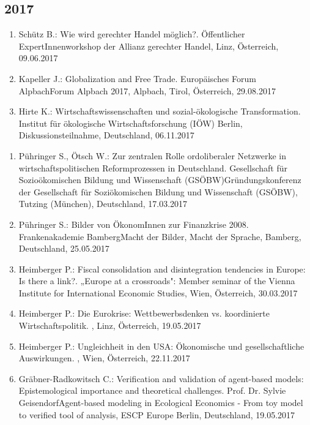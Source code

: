 \subsection*{2017}

\begin{enumerate}
	\item Schütz B.: Wie wird gerechter Handel möglich?. Öffentlicher ExpertInnenworkshop der Allianz gerechter Handel, Linz, Österreich, 09.06.2017
	\item Kapeller J.: Globalization and Free Trade. Europäisches Forum AlpbachForum Alpbach 2017, Alpbach, Tirol, Österreich, 29.08.2017
	\item Hirte K.: Wirtschaftswissenschaften und sozial-ökologische Transformation. Institut für ökologische Wirtschaftsforschung (IÖW) Berlin, Diskussionsteilnahme, Deutschland, 06.11.2017
\end{enumerate}

\begin{enumerate}
	\item Pühringer S., Ötsch W.: Zur zentralen Rolle ordoliberaler Netzwerke in wirtschaftspolitischen Reformprozessen in Deutschland. Gesellschaft für Sozioökomischen Bildung und Wissenschaft (GSÖBW)Gründungskonferenz der Gesellschaft für Soziökomischen Bildung und Wissenschaft (GSÖBW), Tutzing (München), Deutschland, 17.03.2017
	\item Pühringer S.: Bilder von ÖkonomInnen zur Finanzkrise 2008. Frankenakademie BambergMacht der Bilder, Macht der Sprache, Bamberg, Deutschland, 25.05.2017
	\item Heimberger P.: Fiscal consolidation and disintegration tendencies in Europe: Is there a link?. „Europe at a crossroads": Member seminar of the Vienna Institute for International Economic Studies, Wien, Österreich, 30.03.2017
	\item Heimberger P.: Die Eurokrise: Wettbewerbsdenken vs. koordinierte Wirtschaftspolitik. , Linz, Österreich, 19.05.2017
	\item Heimberger P.: Ungleichheit in den USA: Ökonomische und gesellschaftliche Auswirkungen. , Wien, Österreich, 22.11.2017
	\item Gräbner-Radkowitsch C.: Verification and validation of agent-based models: Epistemological importance and theoretical challenges. Prof. Dr. Sylvie GeisendorfAgent-based modeling in Ecological Economics - From toy model to verified tool of analysis, ESCP Europe Berlin, Deutschland, 19.05.2017
\end{enumerate}


